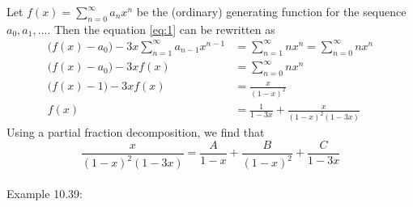 \documentclass[a4paper]{article}
\begin{document}
Let $f(x)=\sum_{n=0}^{\infty}{a_nx^n}$ be the (ordinary) generating function for the sequence $a_0,a_1,\ldots$. Then the equation \ref{eq:1} can be rewritten as
\begin{align*}
    \big(f(x)-a_0\big)-3x\sum_{n=1}^{\infty}{a_{n-1}x^{n-1}}&=\sum_{n=1}^{\infty}{nx^n}=\sum_{n=0}^{\infty}{nx^n}\\
    \big(f(x)-a_0\big)-3xf(x)&=\sum_{n=0}^{\infty}{nx^n}\\
    \big(f(x)-1\big)-3xf(x)&=\frac{x}{(1-x)^2}\\
    f(x)&=\frac{1}{1-3x}+\frac{x}{(1-x)^2(1-3x)}
\end{align*}
Using a partial fraction decomposition, we find that
\begin{equation*}
    \frac{x}{(1-x)^2(1-3x)}=\frac{A}{1-x}+\frac{B}{(1-x)^2}+\frac{C}{1-3x}
\end{equation*}
\\
Example 10.39: 
\end{document}
